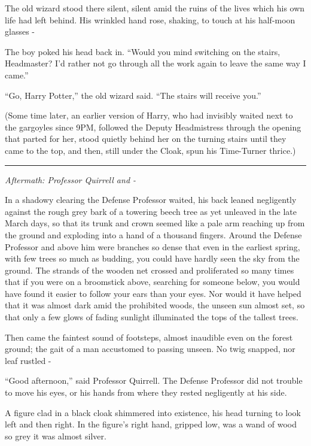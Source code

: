 The old wizard stood there silent, silent amid the ruins of the lives which his own life had left behind. His wrinkled hand rose, shaking, to touch at his half-moon glasses -

The boy poked his head back in. ``Would you mind switching on the stairs, Headmaster? I'd rather not go through all the work again to leave the same way I came.''

``Go, Harry Potter,'' the old wizard said. ``The stairs will receive you.''

(Some time later, an earlier version of Harry, who had invisibly waited next to the gargoyles since 9PM, followed the Deputy Headmistress through the opening that parted for her, stood quietly behind her on the turning stairs until they came to the top, and then, still under the Cloak, spun his Time-Turner thrice.)

\begin{center}\rule{3in}{0.4pt}\end{center}

\emph{Aftermath: Professor Quirrell and -}

In a shadowy clearing the Defense Professor waited, his back leaned negligently against the rough grey bark of a towering beech tree as yet unleaved in the late March days, so that its trunk and crown seemed like a pale arm reaching up from the ground and exploding into a hand of a thousand fingers. Around the Defense Professor and above him were branches so dense that even in the earliest spring, with few trees so much as budding, you could have hardly seen the sky from the ground. The strands of the wooden net crossed and proliferated so many times that if you were on a broomstick above, searching for someone below, you would have found it easier to follow your ears than your eyes. Nor would it have helped that it was almost dark amid the prohibited woods, the unseen sun almost set, so that only a few glows of fading sunlight illuminated the tops of the tallest trees.

Then came the faintest sound of footsteps, almost inaudible even on the forest ground; the gait of a man accustomed to passing unseen. No twig snapped, nor leaf rustled -

``Good afternoon,'' said Professor Quirrell. The Defense Professor did not trouble to move his eyes, or his hands from where they rested negligently at his side.

A figure clad in a black cloak shimmered into existence, his head turning to look left and then right. In the figure's right hand, gripped low, was a wand of wood so grey it was almost silver.

